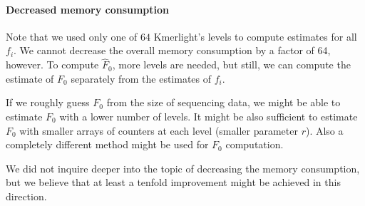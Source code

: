 \paragraph{Decreased memory consumption}
Note that we used only one of $64$ Kmerlight's levels to compute estimates for all $f_i$.
We cannot decrease the overall memory consumption by a factor of 64, however. 
To compute $\hat F_0$, more levels are needed, but still, we can compute the estimate
of $F_0$ separately from the estimates of $f_i$.

If we roughly guess $F_0$ from the size of sequencing data, we might be able
to estimate $F_0$ with a lower number of levels. It might be also sufficient
to estimate $F_0$ with smaller arrays of counters at each level (smaller parameter $r$).
Also a completely different method might be used for $F_0$ computation.

We did not inquire deeper into the topic of decreasing the memory consumption,
but we believe that at least a tenfold improvement might be achieved in this direction.